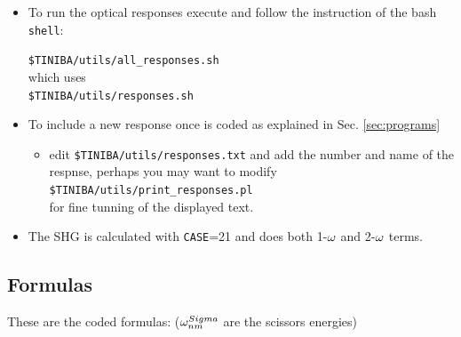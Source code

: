 \documentclass[12pt]{article}
\numberwithin{equation}{section}
\begin{document}
\begin{itemize}

\item To run the optical responses execute and follow the instruction of the bash \verb=shell=:

  \verb=$TINIBA/utils/all_responses.sh=\\
which uses\\
\verb=$TINIBA/utils/responses.sh=

\item To include a new response once is coded as explained in
 Sec. \ref{sec:programs} 

\begin{itemize}
\item edit
\verb=$TINIBA/utils/responses.txt=  
and add the
 number and name of the respnse, perhaps you may want to modify\\
\verb=$TINIBA/utils/print_responses.pl=\\ for fine tunning
of the displayed text.
\end{itemize}
\item The SHG is calculated with \verb=CASE==21 and does both 1-$\omega$
  and 2-$\omega$ terms.
\end{itemize}

\subsection{Formulas}


These are the coded formulas: ($\omega_{nm}^{Sigma}$ are the scissors energies) 
\end{document}
